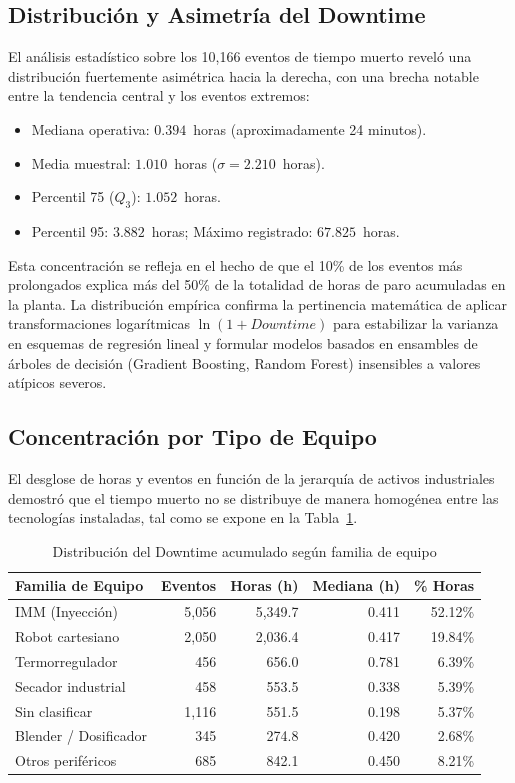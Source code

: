 \documentclass[conference]{IEEEtran}
\begin{document}
\subsection{Distribución y Asimetría del Downtime}
El análisis estadístico sobre los 10,166 eventos de tiempo muerto reveló una distribución fuertemente asimétrica hacia la derecha, con una brecha notable entre la tendencia central y los eventos extremos:
\begin{itemize}
    \item Mediana operativa: $0.394$~horas (aproximadamente 24 minutos).
    \item Media muestral: $1.010$~horas ($\sigma = 2.210$~horas).
    \item Percentil 75 ($Q_3$): $1.052$~horas.
    \item Percentil 95: $3.882$~horas; Máximo registrado: $67.825$~horas.
\end{itemize}
Esta concentración se refleja en el hecho de que el 10\% de los eventos más prolongados explica más del 50\% de la totalidad de horas de paro acumuladas en la planta. La distribución empírica confirma la pertinencia matemática de aplicar transformaciones logarítmicas $\ln(1 + Downtime)$ para estabilizar la varianza en esquemas de regresión lineal y formular modelos basados en ensambles de árboles de decisión (Gradient Boosting, Random Forest) insensibles a valores atípicos severos.

\subsection{Concentración por Tipo de Equipo}
El desglose de horas y eventos en función de la jerarquía de activos industriales demostró que el tiempo muerto no se distribuye de manera homogénea entre las tecnologías instaladas, tal como se expone en la Tabla~\ref{tab:equipos}.

\begin{table}[htbp]
\caption{Distribución del Downtime acumulado según familia de equipo}
\label{tab:equipos}
\begin{center}
\begin{tabular}{lrrrr}
\toprule
\textbf{Familia de Equipo} & \textbf{Eventos} & \textbf{Horas (h)} & \textbf{Mediana (h)} & \textbf{\% Horas} \\
\midrule
IMM (Inyección) & 5,056 & 5,349.7 & 0.411 & 52.12\% \\
Robot cartesiano & 2,050 & 2,036.4 & 0.417 & 19.84\% \\
Termorregulador & 456 & 656.0 & 0.781 & 6.39\% \\
Secador industrial & 458 & 553.5 & 0.338 & 5.39\% \\
Sin clasificar & 1,116 & 551.5 & 0.198 & 5.37\% \\
Blender / Dosificador & 345 & 274.8 & 0.420 & 2.68\% \\
Otros periféricos & 685 & 842.1 & 0.450 & 8.21\% \\
\bottomrule
\end{tabular}
\end{center}
\end{table}
\end{document}

